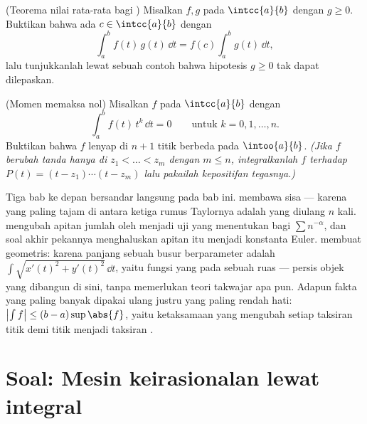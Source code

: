 \begin{exercise}[$\star\star$]\label{exo:b1:integration:11}
(Teorema nilai rata-rata bagi ) Misalkan $f, g$  pada
$\intcc{a}{b}$ dengan $g \geq 0$. Buktikan bahwa ada $c \in
\intcc{a}{b}$ dengan
\[
\int_a^b f(t)\,g(t)\,\dd t = f(c)\int_a^b g(t)\,\dd t ,
\]
lalu tunjukkanlah lewat sebuah contoh bahwa hipotesis $g \geq 0$ tak dapat
dilepaskan.
\end{exercise}

\begin{exercise}[$\star\star\star$]\label{exo:b1:integration:12}
(Momen memaksa nol) Misalkan $f$  pada $\intcc{a}{b}$
dengan
\[
\int_a^b f(t)\,t^k\,\dd t = 0 \qquad \text{untuk } k = 0, 1,
\dots, n .
\]
Buktikan bahwa $f$ lenyap di $n + 1$ titik berbeda pada
$\intoo{a}{b}$. \emph{(Jika $f$ berubah tanda hanya di $z_1 < \dots
< z_m$ dengan $m \leq n$, integralkanlah $f$ terhadap $P(t) = (t - z_1)
\cdots (t - z_m)$ lalu pakailah kepositifan tegasnya.)}
\end{exercise}

\begin{remark}
Tiga bab ke depan bersandar langsung pada bab ini.
 membawa sisa  --- karena yang
paling tajam di antara ketiga rumus Taylornya adalah 
yang diulang $n$ kali.  mengubah apitan
jumlah oleh  menjadi uji yang menentukan bagi $\sum n^{-\alpha}$,
dan soal akhir pekannya menghaluskan apitan itu menjadi konstanta
Euler.  membuat  geometris: karena
panjang sebuah busur berparameter adalah $\int \sqrt{x'(t)^2 +
y'(t)^2}\,\dd t$, yaitu  fungsi yang  pada sebuah
ruas --- persis objek yang dibangun di sini, tanpa memerlukan teori
takwajar apa pun. Adapun fakta yang paling banyak dipakai ulang justru yang paling rendah hati:
$\bigl|\int f\bigr| \leq (b - a)\sup\abs{f}$, yaitu ketaksamaan
yang mengubah setiap taksiran titik demi titik menjadi taksiran .
\end{remark}

\section{Soal: Mesin keirasionalan lewat integral}

